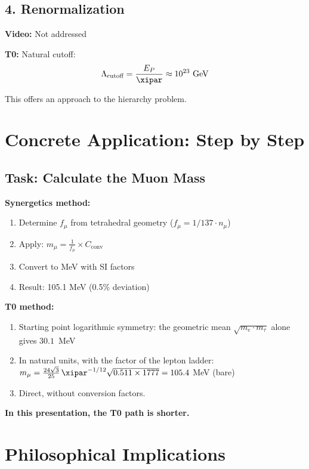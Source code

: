 	\subsection{4. Renormalization}
	
	\textbf{Video:} Not addressed
	
	\textbf{T0:} Natural cutoff:
	\begin{equation}
		\Lambda_{\text{cutoff}} = \frac{E_P}{\xipar} \approx 10^{23} \text{ GeV}
	\end{equation}
	
	This offers an approach to the hierarchy problem.
	
	\section{Concrete Application: Step by Step}
	
	\subsection{Task: Calculate the Muon Mass}
	
	\textbf{Synergetics method:}
	\begin{enumerate}
		\item Determine $f_\mu$ from tetrahedral geometry ($f_\mu = 1/137 \cdot n_\mu$)
		\item Apply: $m_\mu = \frac{1}{f_\mu} \times C_{\text{conv}}$
		\item Convert to MeV with SI factors
		\item Result: 105.1 MeV (0.5\% deviation)
	\end{enumerate}
	
	\textbf{T0 method:}
	\begin{enumerate}
		\item Starting point logarithmic symmetry: the geometric mean $\sqrt{m_e \cdot m_\tau}$ alone gives $30.1$~MeV
		\item In natural units, with the factor of the lepton ladder: $m_\mu = \frac{24\sqrt3}{25}\,\xipar^{-1/12}\sqrt{0.511 \times 1777} = 105.4$ MeV (bare)
		\item Direct, without conversion factors.
	\end{enumerate}
	
	\textbf{In this presentation, the T0 path is shorter.}
	
	\section{Philosophical Implications}
	
